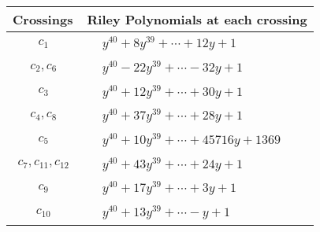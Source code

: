 \documentclass[1p]{elsarticle_modified}
\theoremstyle{definition}
\begin{document}
\begin{tabular}{m{50pt}|m{274pt}}
Crossings & \hspace{64pt}Riley Polynomials at each crossing \\
\hline $$\begin{aligned}c_{1}\end{aligned}$$&$\begin{aligned}
&y^{40}+8 y^{39}+\cdots+12 y+1
\end{aligned}$\\
\hline $$\begin{aligned}c_{2},c_{6}\end{aligned}$$&$\begin{aligned}
&y^{40}-22 y^{39}+\cdots-32 y+1
\end{aligned}$\\
\hline $$\begin{aligned}c_{3}\end{aligned}$$&$\begin{aligned}
&y^{40}+12 y^{39}+\cdots+30 y+1
\end{aligned}$\\
\hline $$\begin{aligned}c_{4},c_{8}\end{aligned}$$&$\begin{aligned}
&y^{40}+37 y^{39}+\cdots+28 y+1
\end{aligned}$\\
\hline $$\begin{aligned}c_{5}\end{aligned}$$&$\begin{aligned}
&y^{40}+10 y^{39}+\cdots+45716 y+1369
\end{aligned}$\\
\hline $$\begin{aligned}c_{7},c_{11},c_{12}\end{aligned}$$&$\begin{aligned}
&y^{40}+43 y^{39}+\cdots+24 y+1
\end{aligned}$\\
\hline $$\begin{aligned}c_{9}\end{aligned}$$&$\begin{aligned}
&y^{40}+17 y^{39}+\cdots+3 y+1
\end{aligned}$\\
\hline $$\begin{aligned}c_{10}\end{aligned}$$&$\begin{aligned}
&y^{40}+13 y^{39}+\cdots- y+1
\end{aligned}$\\
\hline
\end{tabular}\\~\\
\end{document}
